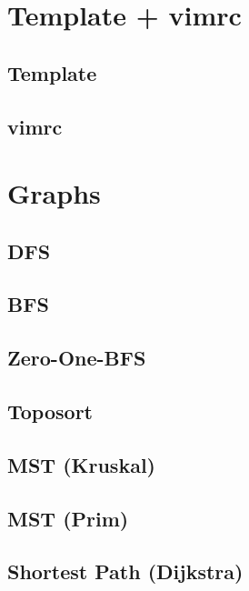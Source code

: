 \section{Template + vimrc}
\subsection{Template}
\raggedbottom
\hrulefill
\subsection{vimrc}
\raggedbottom
\hrulefill

\section{Graphs}
\subsection{DFS}
\raggedbottom
\hrulefill
\subsection{BFS}
\raggedbottom
\hrulefill
\subsection{Zero-One-BFS}
\raggedbottom
\hrulefill
\subsection{Toposort}
\raggedbottom
\hrulefill
\subsection{MST (Kruskal)}
\raggedbottom
\hrulefill
\subsection{MST (Prim)}
\raggedbottom
\hrulefill
\subsection{Shortest Path (Dijkstra)}
\raggedbottom
\hrulefill
